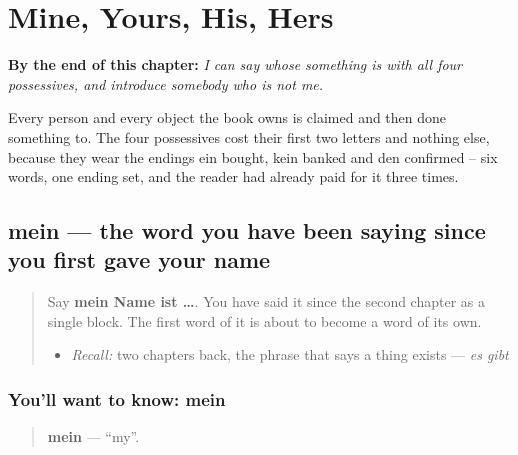 
\chapter{Mine, Yours, His, Hers}
\label{ch:ge-possessiv}

\begin{chapteropening}
\textbf{By the end of this chapter:} \emph{I can say whose something is with all four possessives, and introduce somebody who is not me.}

Every person and every object the book owns is claimed and then done something to. The four possessives cost their first two letters and nothing else, because they wear the endings ein bought, kein banked and den confirmed -- six words, one ending set, and the reader had already paid for it three times.
\end{chapteropening}

\section[mein]{mein — the word you have been saying since you first gave your name}

\label{lesson:GE-C36-mein}



\begin{quote}
Say \textbf{mein Name ist …}. You have said it since the second chapter as a single block. The first word of it is about to become a word of its own.

\begin{itemize}
\raggedright
  \item \emph{Recall:} two chapters back, the phrase that says a thing exists — \emph{es gibt}
\end{itemize}
\end{quote}

\subsection*{You'll want to know: mein}
\begin{quote}
\textbf{mein} — \textquotedblleft{}my\textquotedblright{}.
\end{quote}

